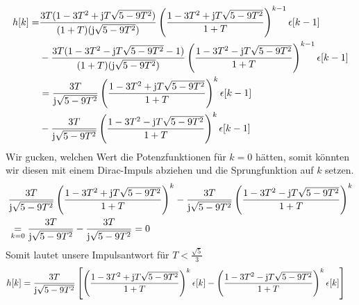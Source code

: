 \documentclass[11pt,a4paper,DIV=12]{scrartcl}
\begin{document}
\begin{align}
	h[k]=&\frac{3T(1-3T^2+\im T\sqrt{5-9T^2})}{(1+T)(\im\sqrt{5-9T^2})}\left(\frac{1-3T^2+\im T\sqrt{5-9T^2}}{1+T}\right)^{k-1}\epsilon[k-1]\nonumber\\
	&-\frac{3T(1-3T^2-\im T\sqrt{5-9T^2}-1)}{(1+T)(\im\sqrt{5-9T^2})}\left(\frac{1-3T^2-\im T\sqrt{5-9T^2}}{1+T}\right)^{k-1}\epsilon[k-1]\nonumber\\
	&=\frac{3T}{\im\sqrt{5-9T^2}}\left(\frac{1-3T^2+\im T\sqrt{5-9T^2}}{1+T}\right)^{k}\epsilon[k-1]\nonumber\\
	&-\frac{3T}{\im\sqrt{5-9T^2}}\left(\frac{1-3T^2-\im T\sqrt{5-9T^2}}{1+T}\right)^{k}\epsilon[k-1]
\end{align}
Wir gucken, welchen Wert die Potenzfunktionen für $k=0$ hätten, somit könnten wir diesen mit einem Dirac-Impuls abziehen und die Sprungfunktion auf $k$ setzen.
\begin{align}
	&\frac{3T}{\im\sqrt{5-9T^2}}\left(\frac{1-3T^2+\im T\sqrt{5-9T^2}}{1+T}\right)^{k}-\frac{3T}{\im\sqrt{5-9T^2}}\left(\frac{1-3T^2-\im T\sqrt{5-9T^2}}{1+T}\right)^{k}\nonumber\\
	&\underset{k=0}{=}\frac{3T}{\im\sqrt{5-9T^2}}-\frac{3T}{\im\sqrt{5-9T^2}}=0
\end{align}
Somit lautet unsere Impulsantwort für $T<\frac{\sqrt{5}}{3}$
\begin{align}
	h[k]&=\frac{3T}{\im\sqrt{5-9T^2}}\left[\left(\frac{1-3T^2+\im T\sqrt{5-9T^2}}{1+T}\right)^{k}\epsilon[k]-\left(\frac{1-3T^2-\im T\sqrt{5-9T^2}}{1+T}\right)^{k}\epsilon[k]\right]
\end{align}
\renewcommand{\refname}{Buchzitate}
\clearpage

\end{document}

